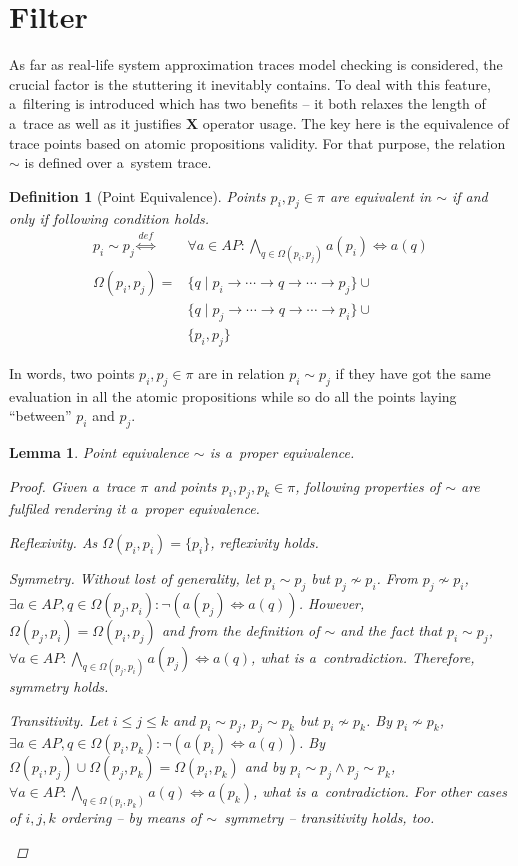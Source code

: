 \documentclass[12pt,oneside,draft]{fithesis}
\newcommand{\bX}{\mathbf{X}}
\newtheorem{mydef}{Definition}
\newtheorem{mylemma}{Lemma}
\begin{document}
\section{Filter}
As far as real-life system approximation traces model checking
is considered, the crucial factor is the stuttering it inevitably
contains\cite{lamport}. To deal with this feature, a~filtering
is introduced which has two benefits -- it both relaxes the length of
a~trace as well as it justifies $\bX$ operator usage. The key here
is the equivalence of trace points based on atomic propositions
validity. For that purpose, the relation $\sim$ is defined over a~system
trace.
\begin{mydef}[Point Equivalence]
Points $p_i,p_j\in\pi$ are equivalent in $\sim$ if and only if following
condition holds.
\begin{align}
	p_i\sim p_j	\overset{def}{\iff}&\forall a\in AP:
		\bigwedge_{q\in\Omega(p_i,p_j)}a(p_i)\iff a(q)\\
\Omega(p_i,p_j)=&\{q\mid p_i\rightarrow\dotsm\rightarrow q
		\rightarrow\dotsm\rightarrow p_j\}\cup\nonumber\\
		&\{q\mid p_j\rightarrow\dotsm\rightarrow q\rightarrow\dotsm
		\rightarrow p_i\}\cup\nonumber\\
		&\{p_i,p_j\}
\end{align}
\end{mydef}
In words, two points $p_i,p_j\in\pi$ are in relation $p_i\sim p_j$ if
they have got the same evaluation in all the atomic propositions while
so do all the points laying ``between'' $p_i$ and $p_j$.
\begin{mylemma}
Point equivalence $\sim$ is a~proper equivalence.
\begin{proof}Given a~trace $\pi$ and points $p_i,p_j,p_k\in\pi$,
following properties of $\sim$ are fulfiled rendering it a~proper
equivalence.
	\begin{inparaenum}
		\item{Reflexivity.} As $\Omega(p_i,p_i)=\{p_i\}$,
			reflexivity holds.
		\item{Symmetry.} Without lost of generality, let $p_i\sim p_j$
			but $p_j\not\sim p_i$. From $p_j\not\sim p_i$,
			$\exists a\in AP,q\in\Omega(p_j, p_i):\neg(a(p_j)
			\iff a(q))$. However, $\Omega(p_j, p_i)=\Omega(p_i,p_j)$
			and from the definition of $\sim$ and the fact that
			$p_i\sim p_j$,
			$\forall a\in AP:\bigwedge_{q\in\Omega(p_j,p_i)}a(p_j)\iff
			a(q)$, what is a~contradiction. Therefore, symmetry holds.
		\item{Transitivity.} Let $i\leq j\leq k$ and $p_i\sim p_j$,
			$p_j\sim p_k$ but $p_i\not\sim p_k$. By $p_i\not\sim p_k$,
			$\exists a\in AP, q\in\Omega(p_i, p_k):
			\neg(a(p_i)\iff a(q))$. By
			$\Omega(p_i,p_j)\cup\Omega(p_j,p_k)=\Omega(p_i,p_k)$ and by
			$p_i\sim p_j\wedge p_j\sim p_k$,
			$\forall a\in AP:\bigwedge_{q\in\Omega(p_i,p_k)}a(q)
			\iff a(p_k)$, what is a~contradiction. For other cases of
			$i,j,k$ ordering -- by means of $\sim$~symmetry --
			transitivity holds, too.
	\end{inparaenum}
	\qedhere
\end{proof}
\end{mylemma}
\end{document}
